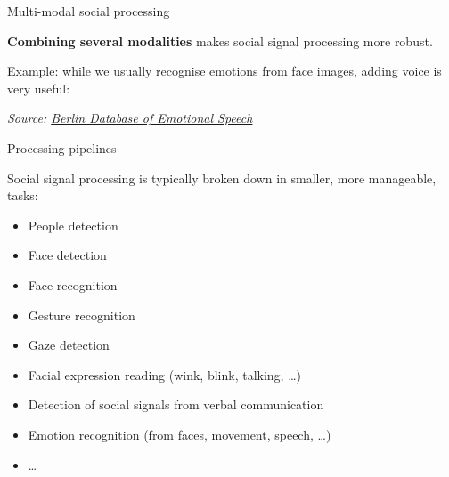 \documentclass[compress]{beamer}
\newcommand{\source}[2]{{\tiny\it Source: \href{#1}{#2}}}
\begin{document}
\begin{frame}{Multi-modal social processing}

    \textbf{Combining several modalities} makes social signal processing more
    robust.

    Example: while we usually recognise emotions from face images, adding voice
    is very useful:

    \begin{center}
        \hspace{0.3em}
        \hspace{0.3em}
        \hspace{0.3em}
        \hspace{0.3em}
    \end{center}
    \source{http://emodb.bilderbar.info/start.html}{Berlin Database of
    Emotional Speech}




\end{frame}


\begin{frame}{Processing pipelines}

Social signal processing is typically broken down in smaller, more manageable,
    tasks:

\begin{itemize}

\item People detection
\item Face detection
\item Face recognition
\item Gesture recognition
\item Gaze detection
\item Facial expression reading (wink, blink, talking, \ldots{})
\item Detection of social signals from verbal communication
\item Emotion recognition (from faces, movement, speech, \ldots{})
\item \ldots{}
\end{itemize}

\end{frame}
\end{document}
